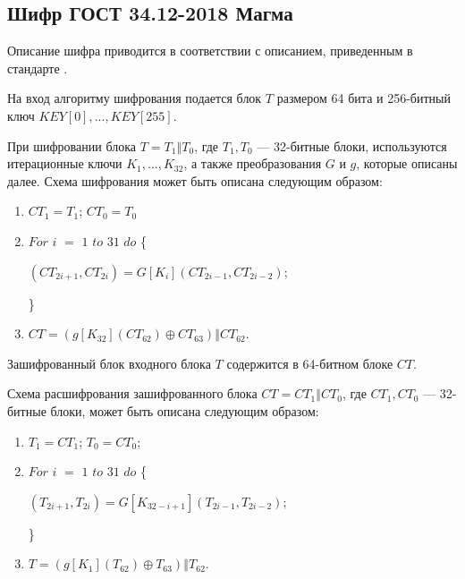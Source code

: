 \documentclass{./civarticle}
\begin{document}
\subsection{Шифр ГОСТ 34.12-2018 Магма}

Описание шифра приводится в соответствии с описанием, приведенным в стандарте \cite{gost}.

На вход алгоритму шифрования подается блок $T$ размером 64 бита и 256-битный ключ $KEY[0], ..., KEY[255]$.

При шифровании блока $T = T_1 \mathbin\Vert T_0$, где $T_1, T_0$ --- 32-битные блоки, используются итерационные ключи $K_1, ..., K_{32}$, а также преобразования $G$ и $g$, которые описаны далее. Схема шифрования может быть описана следующим образом:

\begin{enumerate}
    \item $CT_1 = T_1$; $CT_0 = T_0$

    \item $For$ $i$ $=$ $1$ $to$ $31$ $do$ \{ 

    \hspace{0.5cm} $(CT_{2i+1}, CT_{2i}) = G[K_i](CT_{2i-1}, CT_{2i-2})$;
    
    \}

    \item $CT = (g[K_{32}](CT_{62}) \oplus CT_{63}) \mathbin\Vert CT_{62}$.
    
\end{enumerate}

Зашифрованный блок входного блока $T$ содержится в 64-битном блоке $CT$.


Схема расшифрования зашифрованного блока $CT = CT_1 \mathbin\Vert CT_0$, где $CT_1, CT_0$ --- 32-битные блоки, может быть описана следующим образом:

\begin{enumerate}
    \item $T_1 = CT_1$; $T_0 = CT_0$;

    \item $For$ $i$ $=$ $1$ $to$ $31$ $do$ \{ 

    \hspace{0.5cm} $(T_{2i+1}, T_{2i}) = G[K_{32-i+1}](T_{2i-1}, T_{2i-2})$;
    
    \}

    \item $T = (g[K_{1}](T_{62}) \oplus T_{63}) \mathbin\Vert T_{62}$.
\end{enumerate}
\end{document}
